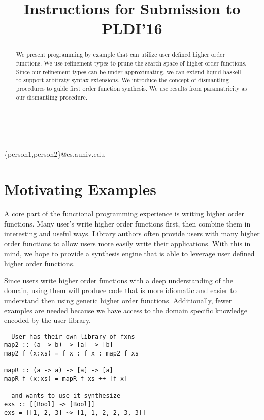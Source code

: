 \documentclass[pldi]{sigplanconf-pldi16}
\begin{document}
\title{Instructions for Submission to PLDI'16}

%
%

{ \\
  \\
}
{\{person1,person2\}@cs.auniv.edu}

\maketitle

\begin{abstract}
  We present programming by example that can utilize user defined higher order functions.
  We use refinement types to prune the search space of higher order functions.
  Since our refinement types can be under approximating, we can extend liquid haskell to support arbitraty syntax extensions.
  We introduce the concept of dismantling procedures to guide first order function synthesis.
  We use results from paramatricity as our dismantling procedure.
\end{abstract}

\section{Motivating Examples}

A core part of the functional programming experience is writing higher order functions. Many user's write higher order functions first, then combine them in interesting and useful ways. Library authors often provide users with many higher order functions to allow users more easily write their applications. With this in mind, we hope to provide a synthesis engine that is able to leverage user defined higher order functions. 

Since users write higher order functions with a deep understanding of the domain, using them will produce code that is more idiomatic and easier to understand then using generic higher order functions. Additionally, fewer examples are needed because we have access to the domain specific knowledge encoded by the user library.

\begin{verbatim}
--User has their own library of fxns
map2 :: (a -> b) -> [a] -> [b]
map2 f (x:xs) = f x : f x : map2 f xs

mapR :: (a -> a) -> [a] -> [a]
mapR f (x:xs) = mapR f xs ++ [f x]

--and wants to use it synthesize
exs :: [[Bool] ~> [Bool]]
exs = [[1, 2, 3] ~> [1, 1, 2, 2, 3, 3]]
\end{verbatim}
\end{document}
